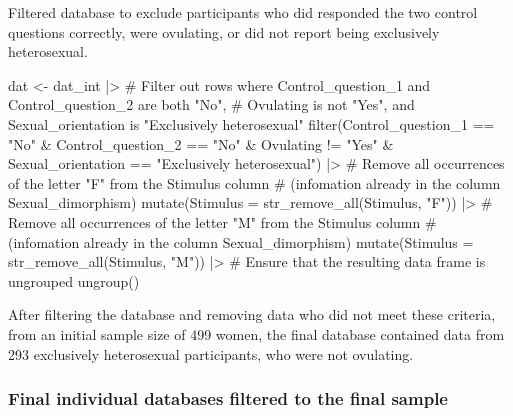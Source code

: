 \documentclass[
  bookmarksnumbered]{article}
\newenvironment{Shaded}{\begin{snugshade}}{\end{snugshade}}
\newcommand{\AttributeTok}[1]{\textcolor[rgb]{0.80,0.80,0.80}{#1}}
\newcommand{\CommentTok}[1]{\textcolor[rgb]{0.50,0.62,0.50}{#1}}
\newcommand{\FunctionTok}[1]{\textcolor[rgb]{0.94,0.94,0.56}{#1}}
\newcommand{\NormalTok}[1]{\textcolor[rgb]{0.80,0.80,0.80}{#1}}
\newcommand{\OtherTok}[1]{\textcolor[rgb]{0.94,0.94,0.56}{#1}}
\newcommand{\SpecialCharTok}[1]{\textcolor[rgb]{0.86,0.64,0.64}{#1}}
\newcommand{\StringTok}[1]{\textcolor[rgb]{0.80,0.58,0.58}{#1}}
\begin{document}
Filtered database to exclude participants who did responded the two control questions correctly, were ovulating, or did not report being exclusively heterosexual.

\begin{Shaded}
\begin{Highlighting}[]
\NormalTok{dat }\OtherTok{\textless{}{-}}\NormalTok{ dat\_int }\SpecialCharTok{|\textgreater{}} 
  \CommentTok{\# Filter out rows where Control\_question\_1 and Control\_question\_2 are both "No",}
  \CommentTok{\# Ovulating is not "Yes", and Sexual\_orientation is "Exclusively heterosexual"}
  \FunctionTok{filter}\NormalTok{(Control\_question\_1 }\SpecialCharTok{==} \StringTok{"No"} 
         \SpecialCharTok{\&}\NormalTok{ Control\_question\_2 }\SpecialCharTok{==} \StringTok{"No"} 
         \SpecialCharTok{\&}\NormalTok{ Ovulating }\SpecialCharTok{!=} \StringTok{"Yes"} 
         \SpecialCharTok{\&}\NormalTok{ Sexual\_orientation }\SpecialCharTok{==} \StringTok{"Exclusively heterosexual"}\NormalTok{) }\SpecialCharTok{|\textgreater{}} 
  \CommentTok{\# Remove all occurrences of the letter "F" from the Stimulus column }
  \CommentTok{\# (infomation already in the column Sexual\_dimorphism)}
  \FunctionTok{mutate}\NormalTok{(}\AttributeTok{Stimulus =} \FunctionTok{str\_remove\_all}\NormalTok{(Stimulus, }\StringTok{"F"}\NormalTok{)) }\SpecialCharTok{|\textgreater{}} 
  \CommentTok{\# Remove all occurrences of the letter "M" from the Stimulus column}
  \CommentTok{\# (infomation already in the column Sexual\_dimorphism)}
  \FunctionTok{mutate}\NormalTok{(}\AttributeTok{Stimulus =} \FunctionTok{str\_remove\_all}\NormalTok{(Stimulus, }\StringTok{"M"}\NormalTok{)) }\SpecialCharTok{|\textgreater{}} 
  \CommentTok{\# Ensure that the resulting data frame is ungrouped}
  \FunctionTok{ungroup}\NormalTok{()}
\end{Highlighting}
\end{Shaded}

After filtering the database and removing data who did not meet these criteria, from an initial sample size of 499 women, the final database contained data from 293 exclusively heterosexual participants, who were not ovulating.

\subsubsection{Final individual databases filtered to the final sample}\label{final-individual-databases-filtered-to-the-final-sample}
\end{document}
